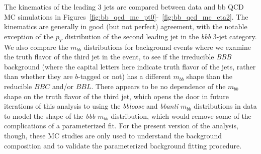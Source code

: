 The kinematics of the leading 3 jets are compared between data and bb QCD MC simulations in 
Figures~\ref{fig:bb_qcd_mc_pt0}-~\ref{fig:bb_qcd_mc_eta2}.  The kinematics are
generally in good (but not perfect) agreement, with the notable exception of the
$p_T$ distribution of the second leading jet in the \textit{bbb} 3-jet category.
We also compare the $m_{bb}$ distributions for background events where we 
examine the truth flavor of the third jet in the event, to see if the irreducible
\textit{BBB} background (where the capital letters here indicate truth flavor
of the jets, rather than whether they are $b$-tagged or not) has a different
$m_{bb}$ shape than the reducible $BBC$ and/or $BBL$.  There appears to be
no dependence of the $m_{bb}$ shape on the truth flavor of the third jet, which
opens the door in future iterations of this analysis to using the 
\textit{bbloose} and \textit{bbanti} $m_{bb}$ distributions in data to 
model the shape of the \textit{bbb} $m_{bb}$ distribution, which would remove
some of the complications of a parameterized fit.  For the present version of the analysis, though,
these MC studies are only used to understand the background composition
and to validate the parameterized background fitting procedure.


